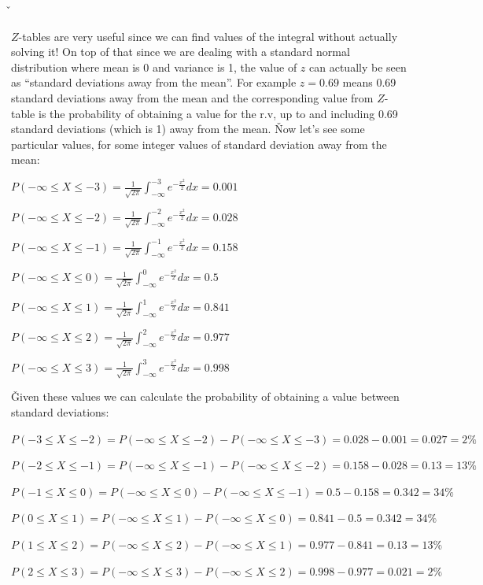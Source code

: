 \v

$Z$-tables are very useful since we can find values of the integral without actually solving it! On top of that since
we are dealing with a standard normal distribution where mean is 0 and variance is 1, the value of $z$ can actually
be seen as ``standard deviations away from the mean''. For example $z=0.69$ means 0.69 standard deviations away
from the mean and the corresponding value from $Z$-table is the probability of obtaining a value for the r.v, up to
and including 0.69 standard deviations (which is 1) away from the mean. \v

Now let's see some particular values, for some integer values of standard deviation away from the mean:
\bit
\item $P(-\infty \leq X \leq -3) = \frac{1}{\sqrt{2\pi}} \int_{-\infty}^{-3} e^{-\frac{x^2}{2}} dx = 0.001$
\item $P(-\infty \leq X \leq -2) = \frac{1}{\sqrt{2\pi}} \int_{-\infty}^{-2} e^{-\frac{x^2}{2}} dx = 0.028$
\item $P(-\infty \leq X \leq -1) = \frac{1}{\sqrt{2\pi}} \int_{-\infty}^{-1} e^{-\frac{x^2}{2}} dx = 0.158$
\item $P(-\infty \leq X \leq 0) = \frac{1}{\sqrt{2\pi}} \int_{-\infty}^{0} e^{-\frac{x^2}{2}} dx = 0.5$
\item $P(-\infty \leq X \leq 1) = \frac{1}{\sqrt{2\pi}} \int_{-\infty}^{1} e^{-\frac{x^2}{2}} dx = 0.841$
\item $P(-\infty \leq X \leq 2) = \frac{1}{\sqrt{2\pi}} \int_{-\infty}^{2} e^{-\frac{x^2}{2}} dx = 0.977$
\item $P(-\infty \leq X \leq 3) = \frac{1}{\sqrt{2\pi}} \int_{-\infty}^{3} e^{-\frac{x^2}{2}} dx = 0.998$
\eit

\v

Given these values we can calculate the probability of obtaining a value between standard deviations:
\bit
\item $P(-3 \leq X \leq -2) = P(-\infty \leq X \leq -2) - P(-\infty \leq X \leq -3) = 0.028 - 0.001 = 0.027 = 2\%$
\item $P(-2 \leq X \leq -1) = P(-\infty \leq X \leq -1) - P(-\infty \leq X \leq -2) = 0.158 - 0.028 = 0.13 = 13\%$
\item $P(-1 \leq X \leq 0) = P(-\infty \leq X \leq 0) - P(-\infty \leq X \leq -1) = 0.5 - 0.158 = 0.342 = 34\%$
\item $P(0 \leq X \leq 1) = P(-\infty \leq X \leq 1) - P(-\infty \leq X \leq 0) = 0.841 - 0.5 = 0.342 = 34\%$
\item $P(1 \leq X \leq 2) = P(-\infty \leq X \leq 2) - P(-\infty \leq X \leq 1) = 0.977 - 0.841 = 0.13 = 13\%$
\item $P(2 \leq X \leq 3) = P(-\infty \leq X \leq 3) - P(-\infty \leq X \leq 2) = 0.998 - 0.977 = 0.021 = 2\%$
\eit


